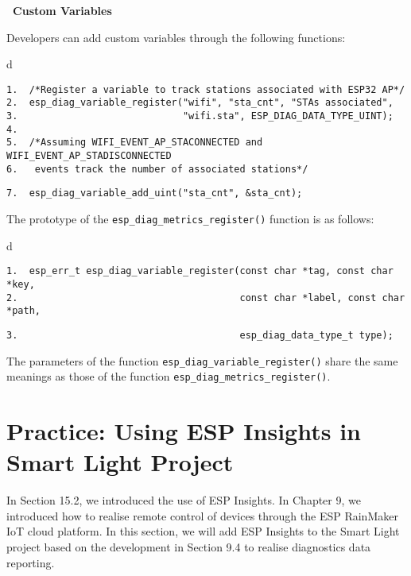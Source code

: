 \documentclass[a4paper,12pt]{book}
\begin{document}
\textbf{\textbullet\ Custom Variables}

Developers can add custom variables through the following functions:

\begin{codebloc}
\begin{tabular}{d}
\vspace{2pt}
\begin{verbatim}
1.  /*Register a variable to track stations associated with ESP32 AP*/
2.  esp_diag_variable_register("wifi", "sta_cnt", "STAs associated",
3.                             "wifi.sta", ESP_DIAG_DATA_TYPE_UINT);
4.
5.  /*Assuming WIFI_EVENT_AP_STACONNECTED and WIFI_EVENT_AP_STADISCONNECTED
6.   events track the number of associated stations*/
\end{verbatim} 
\verb|7.  esp_diag_variable_add_uint("sta_cnt", &sta_cnt);|
\end{tabular}
\end{codebloc}

The prototype of the \verb|esp_diag_metrics_register()| function is as follows:

\begin{codebloc}
\begin{tabular}{d}
\vspace{2pt}
\begin{verbatim}
1.  esp_err_t esp_diag_variable_register(const char *tag, const char *key,
2.                                       const char *label, const char *path,
\end{verbatim} 
\verb|3.                                       esp_diag_data_type_t type);|
\end{tabular}
\end{codebloc}

The parameters of the function \verb|esp_diag_variable_register()| share the same meanings as those of the function \verb|esp_diag_metrics_register()|.

\section{Practice: Using ESP Insights in Smart Light Project}
In Section 15.2, we introduced the use of ESP Insights. In Chapter 9, we introduced how to realise remote control of devices through the ESP RainMaker IoT cloud platform. In this section, we will add ESP Insights to the Smart Light project based on the development in Section 9.4 to realise diagnostics data reporting.
\end{document}
